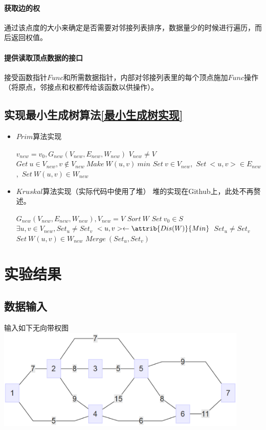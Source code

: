 \documentclass[a4paper,10pt]{ctexart}
\begin{document}
\paragraph{获取边的权}通过该点度的大小来确定是否需要对邻接列表排序，数据量少的时候进行遍历，而后返回权值。
\paragraph{提供读取顶点数据的接口}接受函数指针$Func$和所需数据指针，内部对邻接列表里的每个顶点施加$Func$操作（将原点，邻接点和权都传给该函数以供操作）。

\subsection{实现最小生成树算法\ref{最小生成树实现}}
\begin{itemize}
\item $Prim$算法实现
\begin{codebox}
\li $v_{new} = v_0,G_{new}(V_{new},E_{new},W_{new})$
\li \While $V_{new} \ne V$
    \Do
\li     $Get\ u\in V_{new},v\not\in V_{new}\ Make\ W(u,v)\ min$
\li     $Set\ v \in V_{new}$,\ $Set\ <u,v>\in E_{new}$,\ $Set\ W(u,v)\in W_{new}$
    \End
\end{codebox}
\item $Kruskal$算法实现（实际代码中使用了堆）
堆的实现在Github上，此处不再赘述。
\begin{codebox}
\li $G_{new}(V_{new},E_{new},W_{new}),V_{new}=V$
\li $Sort\ W$
\li $Set \  v_0 \in S$
\li \While $\exists u,v \in V_{new},Set_u \not= Set_v$
    \Do
\li     $<u,v> \gets \attrib{Dis(W)}{Min}$
\li     \If $Set_u \not= Set_v$
        \Do
\li        $Set \ W(u,v) \in W_{new}$
\li        $Merge\ (Set_u,Set_v)$
        \End
    \End
\end{codebox}
\end{itemize}

\section{实验结果}
\subsection{数据输入}
输入如下无向带权图\\
\includegraphics[width=0.9\textwidth]{../Pics/Test-MiniTree.eps}
\end{document}
